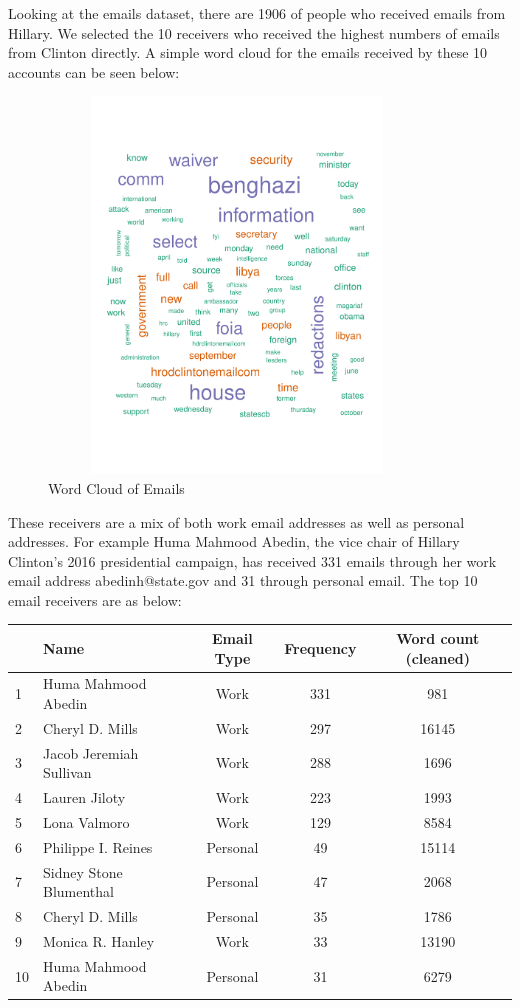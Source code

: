 Looking at the emails dataset, there are 1906 of people who received emails from Hillary. We selected the 10 receivers who received the highest numbers of emails from Clinton directly.
A simple word cloud for the emails received by these 10 accounts can be seen below:
\begin{figure}[h!]
    \centering
    \includegraphics[width=10cm,height=10cm]
    {daitong_and_yihe/wcloud.pdf}
    \caption{Word Cloud of Emails}
\end{figure}

These receivers are a mix of both work email addresses as well as personal addresses. For example Huma Mahmood Abedin, the vice chair of Hillary Clinton's 2016 presidential campaign, has received 331 emails through her work email address abedinh@state.gov and 31 through personal email. 
The top 10 email receivers are as below:
\begin{center}
  \begin{tabular}{ |l| l | c | c |c|}
    \hline
    &Name & Email Type & Frequency & Word count (cleaned)\\ \hline
    1&Huma Mahmood Abedin & Work & 331 & 981 \\ \hline
    2&Cheryl D. Mills & Work & 297 &16145 \\ \hline
    3&Jacob Jeremiah Sullivan & Work & 288 & 1696\\ \hline
    4&Lauren Jiloty & Work & 223 &1993\\ \hline
    5&Lona Valmoro & Work & 129 &8584\\ \hline
    6&Philippe I. Reines & Personal & 49 &15114\\ \hline
    7&Sidney Stone Blumenthal & Personal & 47 &2068\\ \hline
    8&Cheryl D. Mills & Personal & 35 &1786\\ \hline
    9&Monica R. Hanley & Work & 33 &13190\\ \hline
    10&Huma Mahmood Abedin & Personal & 31&6279 \\
    \hline
  \end{tabular}
\end{center}
\\

